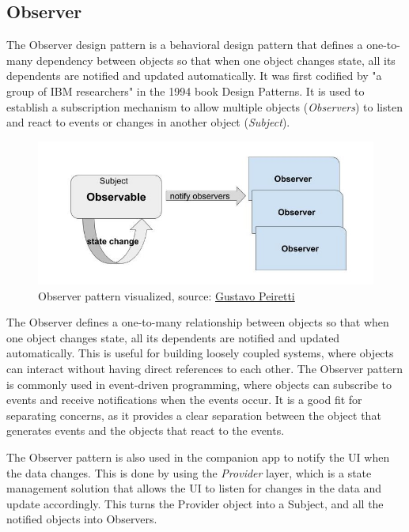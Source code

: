 \subsection{Observer}
\par
The Observer design pattern is a behavioral design pattern that defines a one-to-many dependency between objects so that when one object changes state, 
all its dependents are notified and updated automatically. 
It was first codified by "a group of IBM researchers" \cite{observerDesignPattern} in the 1994 book Design Patterns.
It is used to establish a subscription mechanism to allow multiple objects (\textit{Observers}) to listen and react to events or changes in another object (\textit{Subject}).
\begin{figure}[htbp]
    \centering
    \includegraphics[scale=0.4]{pictures/observer.jpg}
    \caption{Observer pattern visualized, source: \href{https://gustavopeiretti.com/observer-design-pattern/}{Gustavo Peiretti}}
    \label{observerExample}
\end{figure}
\par
The Observer defines a one-to-many relationship between objects so that when one object changes state, all its dependents are notified and updated automatically.
This is useful for building loosely coupled systems, where objects can interact without having direct references to each other.
The Observer pattern is commonly used in event-driven programming, where objects can subscribe to events and receive notifications when the events occur.
It is a good fit for separating concerns, as it provides a clear separation between the object that generates events and the objects that react to the events.
\par
The Observer pattern is also used in the companion app to notify the UI when the data changes.
This is done by using the \textit{Provider} layer, which is a state management solution that allows the UI to listen for changes in the data and update accordingly.
This turns the Provider object into a Subject, and all the notified objects into Observers.
